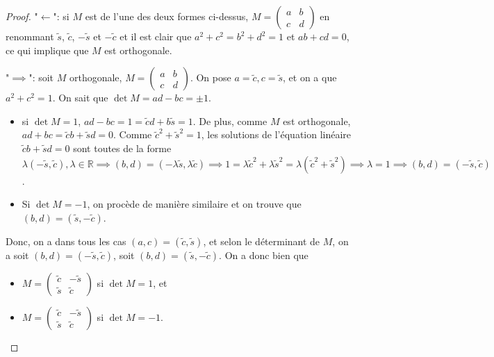 \documentclass{book}
\numberwithin{equation}{section}
\providecommand{\implied}{\longleftarrow}
\begin{document}
\begin{proof}
	"$\implied$": si $M$ est de l'une des deux formes ci-dessus, $M = \left(\begin{smallmatrix} a&b\\c&d \end{smallmatrix}\right)$ en renommant $\tilde s$, $\tilde c$, $-\tilde s$ et $-\tilde c$ et il est clair que $a^2 + c^2 = b^2 + d^2 = 1$ et $ab + cd = 0$, ce qui implique que $M$ est orthogonale. \par
	"$\implies$": soit $M$ orthogonale, $M = \left(\begin{smallmatrix} a&b\\c&d \end{smallmatrix}\right)$. On pose $a = \tilde c, c = \tilde s$, et on a que $a^2 + c^2 = 1$. On sait que $\det M = ad - bc = \pm 1$.
	\begin{itemize}
		\item si $\det M = 1$, $ad - bc = 1 = \tilde cd + b\tilde s = 1$. De plus, comme $M$ est orthogonale, $ad + bc = \tilde cb + \tilde sd = 0$. Comme $\tilde c^2 + \tilde s^2 = 1$, les solutions de l'équation linéaire $\tilde cb + \tilde sd = 0$ sont toutes de la forme $\lambda(-\tilde s, \tilde c), \lambda \in \mathbb R \implies (b, d) = (-\lambda \tilde s, \lambda \tilde c) \implies 1 = \lambda \tilde c^2 + \lambda \tilde s^2 = \lambda(\tilde c^2 + \tilde s^2) \implies \lambda = 1 \implies (b, d) = (-\tilde s, \tilde c)$.
		\item Si $\det M = -1$, on procède de manière similaire et on trouve que $(b, d) = (\tilde s, -\tilde c)$.
	\end{itemize}
	Donc, on a dans tous les cas $(a, c) = (\tilde c, \tilde s)$, et selon le déterminant de $M$, on a soit $(b, d) = (-\tilde s, \tilde c)$, soit $(b, d) = (\tilde s, -\tilde c)$. On a donc bien que
	\begin{itemize}
		\item $M = \begin{pmatrix}
			\tilde c & -\tilde s\\
			\tilde s & \tilde c
		\end{pmatrix}$ si $\det M = 1$, et
		\item $M = \begin{pmatrix}
			\tilde c & -\tilde s\\
			\tilde s & \tilde c
		\end{pmatrix}$ si $\det M = -1$.
	\end{itemize}
\end{proof}
\end{document}
